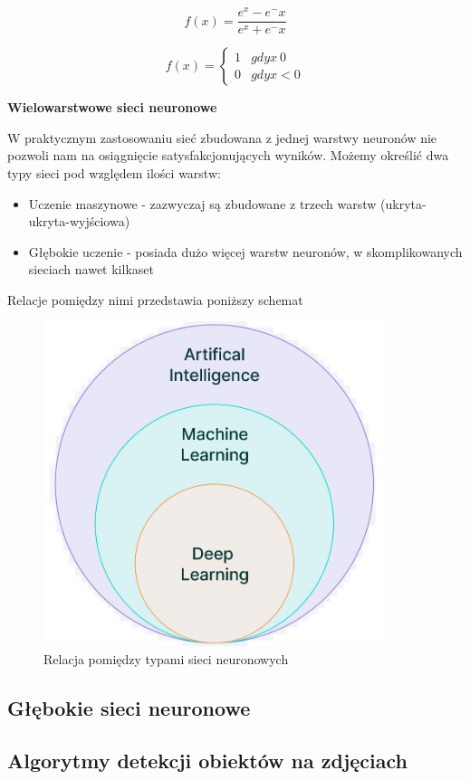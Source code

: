 \begin{equation}
	f(x) = \frac{e^x - e^-x}{e^x + e^-x}
	\label{eq:tangensHiperboliczny}
\end{equation}

\begin{equation}
	f(x) = \begin{cases}
		1 & gdy x \> 0 \\
		0 & gdy x <  0
	\end{cases}
	\label{eq:skokuJednostkowego}
\end{equation}


\textbf{Wielowarstwowe sieci neuronowe}

W praktycznym zastosowaniu sieć zbudowana z jednej warstwy neuronów nie pozwoli nam na osiągnięcie satysfakcjonujących wyników.
Możemy określić dwa typy sieci pod względem ilości warstw: 
\begin{itemize}
	\item Uczenie maszynowe - zazwyczaj są zbudowane z trzech warstw (ukryta-ukryta-wyjściowa) 
	\item Głębokie uczenie - posiada dużo więcej warstw neuronów, w skomplikowanych sieciach nawet kilkaset
\end{itemize}

Relacje pomiędzy nimi przedstawia poniższy schemat
\begin{figure}[H]
	\centering
	\includegraphics[width=10cm]{pages/teoria/zdjecia/schematAI.jpg}
	\caption{Relacja pomiędzy typami sieci neuronowych \cite{schematAISite}}
	\label{rys:schematAI}
\end{figure}


\subsection{Głębokie sieci neuronowe}


\subsection{Algorytmy detekcji obiektów na zdjęciach}

